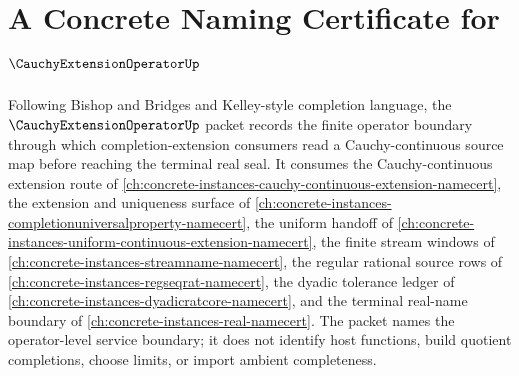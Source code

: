 \chapter{A Concrete Naming Certificate for $\CauchyExtensionOperatorUp$}
\label{ch:concrete-instances-cauchy-extension-operator-namecert}

Following Bishop and Bridges and Kelley-style completion language, the $\CauchyExtensionOperatorUp$ packet records the finite operator boundary through which completion-extension consumers read a Cauchy-continuous source map before reaching the terminal real seal. It consumes the Cauchy-continuous extension route of \autoref{ch:concrete-instances-cauchy-continuous-extension-namecert}, the extension and uniqueness surface of \autoref{ch:concrete-instances-completionuniversalproperty-namecert}, the uniform handoff of \autoref{ch:concrete-instances-uniform-continuous-extension-namecert}, the finite stream windows of \autoref{ch:concrete-instances-streamname-namecert}, the regular rational source rows of \autoref{ch:concrete-instances-regseqrat-namecert}, the dyadic tolerance ledger of \autoref{ch:concrete-instances-dyadicratcore-namecert}, and the terminal real-name boundary of \autoref{ch:concrete-instances-real-namecert}. The packet names the operator-level service boundary; it does not identify host functions, build quotient completions, choose limits, or import ambient completeness.

